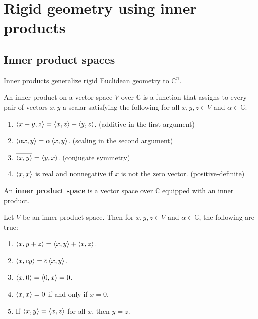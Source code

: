 \chapter{Rigid geometry using inner products}

\section{Inner product spaces}
Inner products generalize rigid Euclidean geometry to \(\mathbb{C}^n\).
\begin{definition}
  An inner product on a vector space \(V\) over \(\mathbb{C}\)
  is a function that assigns to every pair of vectors \(x, y\) a scalar
   satisfying the following for all \(x,y, z\in V\) and \(\alpha \in \mathbb{C}\):
  \begin{enumerate}
    \item \(\left\langle x+y, z\right\rangle = \left\langle x, z\right\rangle + \left\langle y, z\right\rangle\). (additive in the first argument)
    \item \(\left\langle\alpha x, y\right\rangle = \alpha \left\langle x, y\right\rangle\). (scaling in the second argument)
    \item \(\overline{\left\langle x, y\right\rangle} = \left\langle y, x\right\rangle\). (conjugate symmetry)
    \item \(\left\langle x, x\right\rangle\) is real and nonnegative if \(x\) is not the zero vector. (positive-definite)
  \end{enumerate}
\end{definition}
\begin{definition}
  An \textbf{inner product space} is a vector space over \(\mathbb{C}\) equipped with an inner product.
\end{definition}
\begin{theorem}
  Let \(V\) be an inner product space.
  Then for \(x, y, z \in V\) and \(\alpha \in \mathbb{C}\),
  the following are true:
  \begin{enumerate}
    \item \(\left\langle x, y+z\right\rangle = \left\langle x, y\right\rangle + \left\langle x, z\right\rangle\).
    \item \(\left\langle x, cy\right\rangle = \overline{c} \left\langle x, y\right\rangle\).
    \item \(\left\langle x, 0\right\rangle = \left\langle0, x\right\rangle = 0\).
    \item \(\left\langle x, x\right\rangle = 0\) if and only if \(x = 0\).
    \item If \(\left\langle x, y\right\rangle = \left\langle x, z\right\rangle \) for all \(x\), then \(y = z\).
  \end{enumerate}
\end{theorem}

